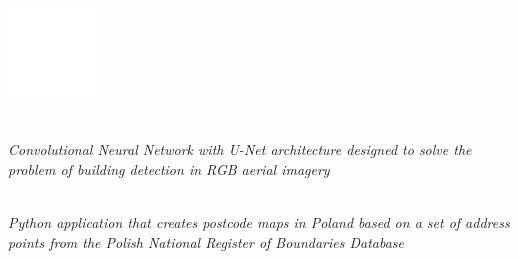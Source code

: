 \documentclass{cls/gml_cv_sets}
\begin{document}
\begin{paracol}{2}

\paracolbackgroundoptions
\footnotesize

{\setasidefontcolour

 \\

\hspace{-2.3em}\radarplot
\vspace{0.1em}

\vspace{-1em}

\begin{center}
    \includegraphics[height=2.5cm]{imgs/qr_code.png} \\
\end{center}
\vspace{-1em}

{\small

 \\

\textit{\footnotesize Convolutional Neural Network with U-Net architecture 
designed to solve the problem of building detection in RGB aerial imagery} \\
\vspace{0.6em}

 \\ 

\textit{\footnotesize Python application that creates postcode maps in Poland 
based on a set of address points from the Polish National Register of 
Boundaries Database} \\ \vspace{0.6em}

 \\ 

}}
\end{paracol}
\end{document}
